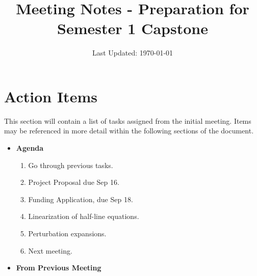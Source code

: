 \documentclass[a4paper,reqno]{article}
\title{Meeting Notes - Preparation for Semester 1 Capstone}
\date{Last Updated: \today}
\begin{document}
\maketitle
\section{Action Items}
 This section will contain a list of tasks assigned from the initial meeting. Items may be referenced in more detail within the following sections of the document.  
    \begin{itemize}
        \item \textbf{Agenda} 
            \begin{enumerate}
            	   \item Go through previous tasks.
                \item Project Proposal due Sep 16.
                \item Funding Application, due Sep 18.
                \item Linearization of half-line equations.
                \item Perturbation expansions.
                \item Next meeting.
            \end{enumerate}
        \item \textbf{From Previous Meeting}
            \begin{enumerate}
                

\end{enumerate}
\end{itemize}
\end{document}
